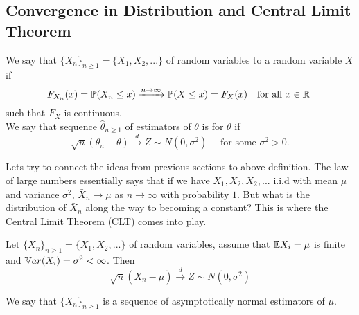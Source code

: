 \subsection{Convergence in Distribution and Central Limit Theorem}
\begin{definition} 
    We say that $\{ X_n \}_{n \geq 1}  = \{ X_1,X_2,... \}$ of random variables  to a random variable $X$ if 
    $$
    F_{X_n}(x) = \mathbb P(X_n \leq x) \xrightarrow{n \to \infty} \mathbb P(X \leq x) = F_{X}(x) \quad \text{for all } x \in \mathbb R \
    $$
    such that $F_X$ is continuous.\\
    We say that sequence $\hat{\theta}_{n \geq 1}$ of estimators of $\theta$ is  for $\theta$ if 
    $$
    \sqrt{n}(\theta_n - \theta) \xrightarrow{d} Z \sim N(0,\sigma^2) \quad \text{ for some } \sigma^2 >0.
    $$
\end{definition}
Lets try to connect the ideas from previous sections to above definition. The law of large numbers essentially says that if we have $X_1,X_2,X_2,...$ i.i.d with mean $\mu$ and variance $\sigma^2$, $\bar{X}_n \to \mu$ as $n \to \infty$ with probability $1$. But what is the distribution of $\bar{X}_n$ along the way to becoming a constant? This is where the Central Limit Theorem (CLT) comes into play. 
\begin{theorem}
    Let $\{ X_n \}_{n \geq 1}  = \{ X_1,X_2,... \}$ of random variables, assume that $\mathbb E X_i = \mu$ is finite and $\mathbb V ar(X_i) = \sigma^2 < \infty$.
    Then 
    $$
    \sqrt{n}(\bar{X}_n - \mu) \xrightarrow{d} Z \sim N(0,\sigma^2)
    $$
\end{theorem}
We say that $\{ X_n \}_{n \geq 1}$ is a sequence of asymptotically normal estimators of $\mu$.
\begin{note}
\end{note}